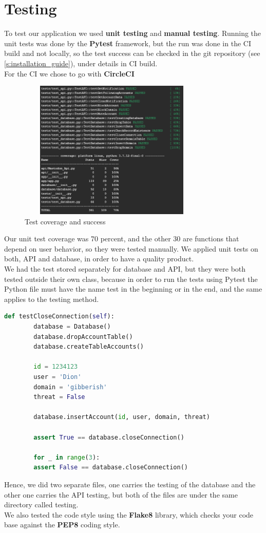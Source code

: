 \section{Testing}
To test our application we used \textbf{unit testing} and \textbf{manual testing}.
Running the unit tests was done by the \textbf{Pytest} \cite{pytest} framework, but the run was done in
the CI build and not locally, so the test success can be checked in the git repository (see \ref{s:installation_guide}), under
details in CI build.
\\[5pt]
For the CI we chose to go with \textbf{CircleCI} \cite{ci}
\\[5pt]
\begin{figure}[H]
	\centering
	\includegraphics[width=0.8\textwidth,height=250px]{images/test_score2.png}
	\caption{Test coverage and success}
	\label{fig:test_data}
\end{figure}
Our unit test coverage was 70 percent, and the other 30 are functions that depend on user behavior, so they were tested manually.
We applied unit tests on both, API and database, in order to have a quality product.
\\[5pt]
We had the test stored separately for database and API, but they were both tested outside their own class, because
in order to run the tests using Pytest the Python file must have the name test in the beginning or in the end, and the
same applies to the testing method.
\\[5pt]
\begin{lstlisting}[language=python, caption={Example method to test a unit}, captionpos=b]
 	def testCloseConnection(self):
		database = Database()
		database.dropAccountTable()
		database.createTableAccounts()

		id = 1234123
		user = 'Dion'
		domain = 'gibberish'
		threat = False

		database.insertAccount(id, user, domain, threat)

		assert True == database.closeConnection()

		for _ in range(3):
		assert False == database.closeConnection()
\end{lstlisting}
Hence, we did two separate files, one carries the testing of the database and the other one carries the API testing, but
both of the files are under the same directory called testing.
\\[5pt]
We also tested the code style using the \textbf{Flake8} \cite{flake} library, which checks your code base against the \textbf{PEP8} \cite{pep} coding
style.
